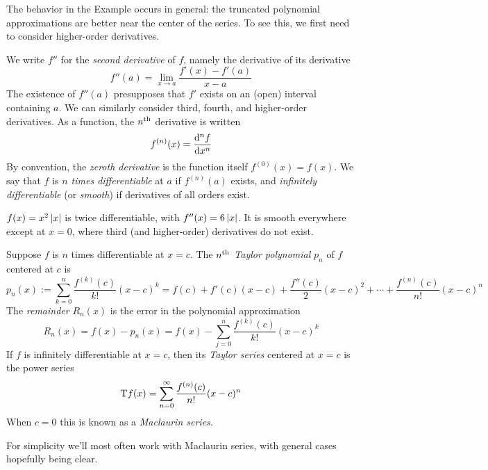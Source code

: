 The behavior in the Example occurs in general: the truncated polynomial approximations are better near the center of the series. To see this, we first need to consider higher-order derivatives.

\begin{defn}{}{}
We write $f''$ for the \emph{second derivative} of $f$, namely the derivative of its derivative
\[f''(a)=\lim_{x\to a}\frac{f'(x)-f'(a)}{x-a}\]
The existence of $f''(a)$ presupposes that $f'$ exists on an (open) interval containing $a$. We can similarly consider third, fourth, and higher-order derivatives. As a function, the $n\th$ derivative is written
\[f^{(n)}(x)=\diff[^nf]{x^n}\]
By convention, the \emph{zeroth derivative} is the function itself $f^{(0)}(x)=f(x)$. We say that $f$ is \emph{$n$ times differentiable} at $a$ if $f^{(n)}(a)$ exists, and \emph{infinitely differentiable} (or \emph{smooth}) if derivatives of all orders exist.
\end{defn}

\begin{example}{}{}
$f(x)=x^2\nm x$ is twice differentiable, with $f''(x)=6\nm x$. It is smooth everywhere except at $x=0$, where third (and higher-order) derivatives do not exist.
\end{example}

\goodbreak

\begin{defn}{}{}
Suppose $f$ is $n$ times differentiable at $x=c$. The \emph{$n\th$ Taylor polynomial} $p_n$ of $f$ centered at $c$ is
\[p_n(x):=\sum_{k=0}^n\frac{f^{(k)}(c)}{k!}(x-c)^k =f(c)+f'(c)(x-c)+\frac{f''(c)}2(x-c)^2+\cdots+\frac{f^{(n)}(c)}{n!}(x-c)^n\]
The \emph{remainder} $R_n(x)$ is the error in the polynomial approximation
\[R_n(x)=f(x)-p_n(x)=f(x)-\sum_{j=0}^{n}\frac{f^{(k)}(c)}{k!}(x-c)^k\]
If $f$ is infinitely differentiable at $x=c$, then its \emph{Taylor series} centered at $x=c$ is the power series
\[\rT f(x)=\sum_{n=0}^\infty\frac{f^{(n)}(c)}{n!}(x-c)^n\]
When $c=0$ this is known as a \emph{Maclaurin series.}\footnotemark
\end{defn}


For simplicity we'll most often work with Maclaurin series, with general cases hopefully being clear.

